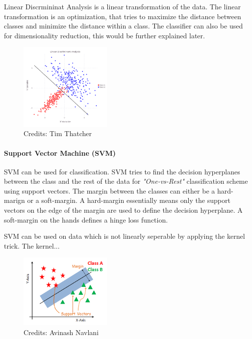 Linear Discrmininat Analysis is a linear transformation of the data. The linear transformation is an optimization, that tries to maximize the distance between classes and minimize the distance within a class. The classifier can also be used for dimensionality reduction, this would be further explained later.

\begin{figure}[H]
    \centering
    \includegraphics[width=0.4\textwidth]{figures/lda_deci.png}
    \caption[]{Credits: Tim Thatcher}
    \label{fig:lda_dec}
\end{figure}

\paragraph{Support Vector Machine (SVM)}

SVM can be used for classification. SVM tries to find the decision hyperplanes between the class and the rest of the data for \textit{"One-vs-Rest"} classification scheme using support vectors. 
The margin between the classes can either be a hard-marign or a soft-margin. A hard-margin essentially means only the support vectors on the edge of the margin are used to define the decision hyperplane. A soft-margin on the hands defines a hinge loss function.

SVM can be used on data which is not linearly seperable by applying the kernel trick. The kernel...  

\begin{figure}[H]
    \centering
    \includegraphics[width=0.4\textwidth]{figures/svm.png}
    \caption[]{Credits: Avinash Navlani}
    \label{fig:svm}
\end{figure}

